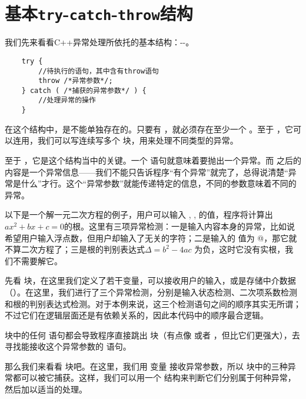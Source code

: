 \section{基本\texttt{try}-\texttt{catch}-\texttt{throw}结构}
我们先来看看C++异常处理所依托的基本结构：\lstinline@try@-\lstinline@catch@-\lstinline@throw@。\par
\begin{lstlisting}
    try {
        //待执行的语句，其中含有throw语句
        throw /*异常参数*/;
    } catch ( /*捕获的异常参数*/ ) {
        //处理异常的操作
    }
\end{lstlisting}
在这个结构中，\lstinline@try@ 是不能单独存在的。只要有 \lstinline@try@，就必须存在至少一个 \lstinline@catch@。至于 \lstinline@catch@，它可以连用，我们可以写连续写多个 \lstinline@catch@ 块，用来处理不同类型的异常。\par
至于 \lstinline@throw@，它是这个结构当中的关键。一个 \lstinline@throw@ 语句就意味着要抛出一个异常。而 \lstinline@throw@ 之后的内容是一个异常信息——我们不能只告诉程序``有个异常''就完了，总得说清楚``异常是什么''才行。这个``异常参数''就能传递特定的信息，不同的参数意味着不同的异常。\par
以下是一个解一元二次方程的例子，用户可以输入 \lstinline@a@, \lstinline@b@, \lstinline@c@ 的值，程序将计算出$ax^2+bx+c=0$的根。这里有三项异常检测：一是输入内容本身的异常，比如说希望用户输入浮点数，但用户却输入了无关的字符；二是输入的 \lstinline@a@ 值为 @，那它就不算二次方程了；三是根的判别表达式$\Delta=b^2-4ac$ 为负，这时它没有实根，我们不需要解它。\par
\par
先看 \lstinline@try@ 块，在这里我们定义了若干变量，可以接收用户的输入，或是存储中介数据（\lstinline@Delta@）。在这里，我们进行了三个异常检测，分别是输入状态检测、二次项系数检测和根的判别表达式检测。对于本例来说，这三个检测语句之间的顺序其实无所谓；不过它们在逻辑层面还是有依赖关系的，因此本代码中的顺序最合逻辑。\par
\lstinline@try@ 块中的任何 \lstinline@throw@ 语句都会导致程序直接跳出 \lstinline@try@ 块（有点像 \lstinline@break@ 或者 \lstinline@return@，但比它们更强大），去寻找能接收这个异常参数的 \lstinline@catch@ 语句。\par
那么我们来看看 \lstinline@catch@ 块吧。在这里，我们用 \lstinline@int@ 变量 \lstinline@error@ 接收异常参数，所以 \lstinline@try@ 块中的三种异常都可以被它捕获。这样，我们可以用一个 \lstinline@switch@ 结构来判断它们分别属于何种异常，然后加以适当的处理。\par
